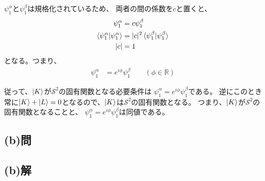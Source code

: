 $\psi_1^{\alpha}$と$\psi_1^{\beta}$は規格化されているため、
両者の間の係数を$c$と置くと、
\begin{align}
	\psi_1^{\alpha}
&=
	c\psi_1^{\beta} \\
%
%
	\braket{\psi_1^{\alpha}|\psi_1^{\alpha}}
&=
	|c|^2 \braket{\psi_1^{\beta}|\psi_1^{\beta}} \\
%
%
	|c|
&=
	1
\end{align}
となる。つまり、
\begin{align}
	\psi_1^{\alpha}
&=
	e^{i\phi} \psi_1^{\beta}
	\qquad
	(\phi\in\mathbb{R})
\end{align}

従って、$\ket{K}$が$\mathscr{S}^2$の固有関数となる必要条件は
$\psi_1^{\alpha}=e^{i\phi} \psi_1^{\beta}$である。
逆にこのとき常に$\ket{K}+\ket{L}=0$となるので、$\ket{K}$は$\mathscr{S}^2$の固有関数となる。
つまり、$\ket{K}$が$\mathscr{S}^2$の固有関数となることと、
$\psi_1^{\alpha}=e^{i\phi} \psi_1^{\beta}$は同値である。


\subsection{(b)問}



\subsection{(b)解}








